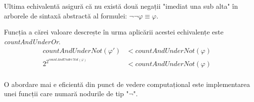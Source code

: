 Ultima echivalentă asigură că nu există două negații "imediat una sub alta" în arborele de sintaxă abstractă al formulei: $\neg \neg \varphi \equiv \varphi.$

Funcția a cărei valoare descrește în urma aplicării acestei echivalențe este \textit{countAndUnderOr}.
\begin{align*}
	countAndUnderNot(\varphi') &< countAndUnderNot(\varphi) \\
	2^{2^{countAndUnderNot(\varphi)}} &< countAndUnderNot(\varphi)\\
\end{align*}

O abordare mai e eficientă din punct de vedere computațional este implementarea unei funcții care numară nodurile de tip "$\neg$".



